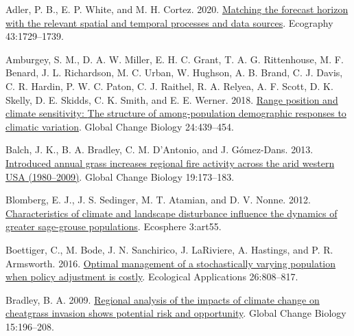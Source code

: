 \documentclass[
  12pt,
]{article}
\newlength{\cslhangindent}
\newlength{\cslentryspacingunit} %
\newenvironment{CSLReferences}[2] %
 {%
  \setlength{\parindent}{0pt}
  \ifodd #1
  \let\oldpar\par
  \def\par{\hangindent=\cslhangindent\oldpar}
  \fi
  \setlength{\parskip}{#2\cslentryspacingunit}
 }%
 {}
\begin{document}
\setlength{\parindent}{-0.2in}
\setlength{\leftskip}{0.2in}
\setlength{\parskip}{8pt}

\noindent

\hypertarget{refs}{}
\begin{CSLReferences}{1}{0}
\leavevmode{}%
Adler, P. B., E. P. White, and M. H. Cortez. 2020. \href{https://doi.org/10.1111/ecog.05271}{Matching the forecast horizon with the relevant spatial and temporal processes and data sources}. Ecography 43:1729--1739.

\leavevmode{}%
Amburgey, S. M., D. A. W. Miller, E. H. C. Grant, T. A. G. Rittenhouse, M. F. Benard, J. L. Richardson, M. C. Urban, W. Hughson, A. B. Brand, C. J. Davis, C. R. Hardin, P. W. C. Paton, C. J. Raithel, R. A. Relyea, A. F. Scott, D. K. Skelly, D. E. Skidds, C. K. Smith, and E. E. Werner. 2018. \href{https://doi.org/10.1111/gcb.13817}{Range position and climate sensitivity: {The} structure of among-population demographic responses to climatic variation}. Global Change Biology 24:439--454.

\leavevmode{}%
Balch, J. K., B. A. Bradley, C. M. D'Antonio, and J. Gómez-Dans. 2013. \href{https://doi.org/10.1111/gcb.12046}{Introduced annual grass increases regional fire activity across the arid western {USA} (1980--2009)}. Global Change Biology 19:173--183.

\leavevmode{}%
Blomberg, E. J., J. S. Sedinger, M. T. Atamian, and D. V. Nonne. 2012. \href{https://doi.org/10.1890/ES11-00304.1}{Characteristics of climate and landscape disturbance influence the dynamics of greater sage-grouse populations}. Ecosphere 3:art55.

\leavevmode{}%
Boettiger, C., M. Bode, J. N. Sanchirico, J. LaRiviere, A. Hastings, and P. R. Armsworth. 2016. \href{https://doi.org/10.1890/15-0236}{Optimal management of a stochastically varying population when policy adjustment is costly}. Ecological Applications 26:808--817.

\leavevmode{}%
Bradley, B. A. 2009. \href{https://doi.org/10.1111/j.1365-2486.2008.01709.x}{Regional analysis of the impacts of climate change on cheatgrass invasion shows potential risk and opportunity}. Global Change Biology 15:196--208.


\end{CSLReferences}
\end{document}
